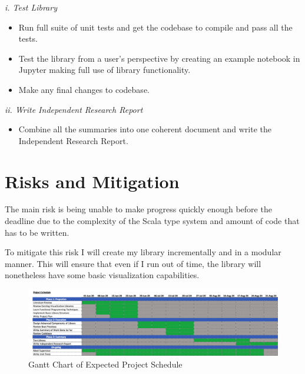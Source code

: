 \documentclass[12pt]{article}
\begin{document}
\textit{i. Test Library}

\begin{itemize}
\item Run full suite of unit tests and get the codebase to compile and pass all the tests. 

\item Test the library from a user's perspective by creating an example notebook in Jupyter making full use of library functionality. 

\item Make any final changes to codebase.
\end{itemize}

\textit{ii. Write Independent Research Report}

\begin{itemize}
\item Combine all the summaries into one coherent document and write the Independent Research Report.
\end{itemize}

\section{Risks and Mitigation}

The main risk is being unable to make progress quickly enough before the deadline due to the complexity of the Scala type system and amount of code that has to be written. 

To mitigate this risk I will create my library incrementally and in a modular manner. This will ensure that even if I run out of time, the library will nonetheless have some basic visualization capabilities.

\pagebreak
\begin{landscape}
	
\begin{figure}[h]
\begin{center}
\includegraphics[scale=0.65]{Gantt}
\end{center}
\caption{Gantt Chart of Expected Project Schedule}
\end{figure}

\end{landscape}
\pagebreak
\printbibliography
\end{document}
